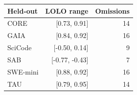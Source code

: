\begin{tabular}{lrr}
\toprule
Held-out & LOLO range & Omissions \\
\midrule
CORE & [0.73, 0.91] & 14 \\
GAIA & [0.84, 0.92] & 16 \\
SciCode & [-0.50, 0.14] & 9 \\
SAB & [-0.77, -0.43] & 7 \\
SWE-mini & [0.88, 0.92] & 16 \\
TAU & [0.79, 0.95] & 14 \\
\bottomrule
\end{tabular}
